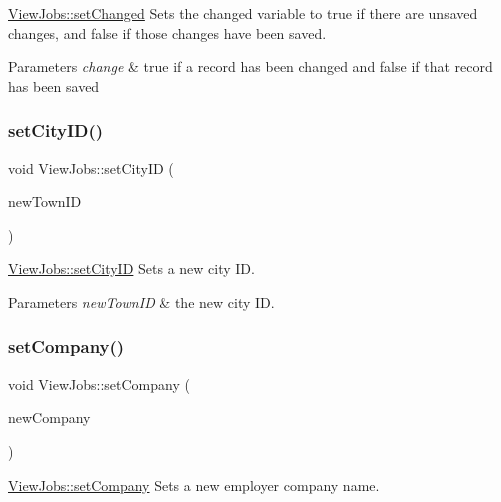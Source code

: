 \hyperlink{class_view_jobs_a3cba868c6deadaf4b35c18982f7ec35e}{View\+Jobs\+::set\+Changed} Sets the changed variable to true if there are unsaved changes, and false if those changes have been saved. 


\begin{DoxyParams}{Parameters}
{\em change} & true if a record has been changed and false if that record has been saved \\
\hline
\end{DoxyParams}
\mbox{\label{class_view_jobs_ad89218b37af85cac9ce6c346efb57e56}} 
\subsubsection{\texorpdfstring{set\+City\+I\+D()}{setCityID()}}
{\footnotesize\ttfamily void View\+Jobs\+::set\+City\+ID (\begin{DoxyParamCaption}\item[{int}]{new\+Town\+ID }\end{DoxyParamCaption})}



\hyperlink{class_view_jobs_ad89218b37af85cac9ce6c346efb57e56}{View\+Jobs\+::set\+City\+ID} Sets a new city ID. 


\begin{DoxyParams}{Parameters}
{\em new\+Town\+ID} & the new city ID. \\
\hline
\end{DoxyParams}
\mbox{\label{class_view_jobs_a596246d07be66a5aeaf14ff8e5649290}} 
\subsubsection{\texorpdfstring{set\+Company()}{setCompany()}}
{\footnotesize\ttfamily void View\+Jobs\+::set\+Company (\begin{DoxyParamCaption}\item[{Q\+String}]{new\+Company }\end{DoxyParamCaption})}



\hyperlink{class_view_jobs_a596246d07be66a5aeaf14ff8e5649290}{View\+Jobs\+::set\+Company} Sets a new employer company name. 


